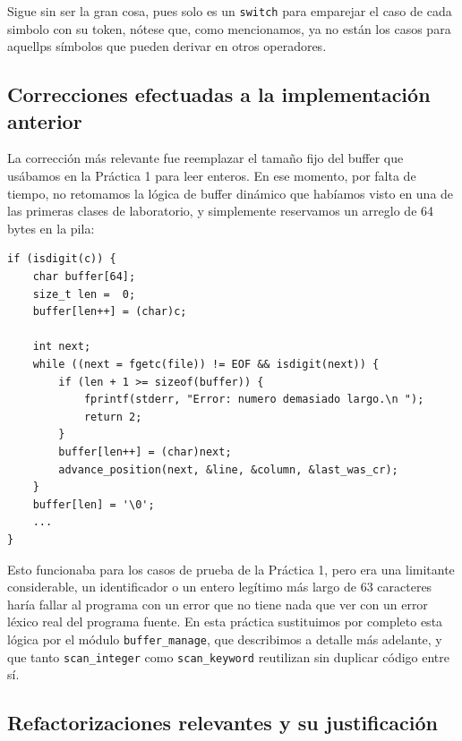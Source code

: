 \documentclass[12pt,letterpaper]{article}
\begin{document}
\bigskip

Sigue sin ser la gran cosa, pues solo es un \texttt{switch} para emparejar el caso de cada simbolo con su token,
nótese que, como mencionamos, ya no están los casos para aquellps símbolos que pueden derivar en otros
operadores.

\subsection*{Correcciones efectuadas a la implementación anterior}

La corrección más relevante fue reemplazar el tamaño fijo del buffer que usábamos en la Práctica 1 para leer
enteros. En ese momento, por falta de tiempo, no retomamos la lógica de buffer dinámico que habíamos visto en
una de las primeras clases de laboratorio, y simplemente reservamos un arreglo de 64 bytes en la pila:

\begin{lstlisting}[style=modernc, caption={Buffer de tamaño fijo usado en la Práctica 1 (\texttt{lexer-p1.c}).}]
if (isdigit(c)) {
    char buffer[64];
    size_t len =  0;
    buffer[len++] = (char)c;

    int next;
    while ((next = fgetc(file)) != EOF && isdigit(next)) {
        if (len + 1 >= sizeof(buffer)) {
            fprintf(stderr, "Error: numero demasiado largo.\n ");
            return 2;
        }
        buffer[len++] = (char)next;
        advance_position(next, &line, &column, &last_was_cr);
    }
    buffer[len] = '\0';
    ...
}
\end{lstlisting}

\bigskip

Esto funcionaba para los casos de prueba de la Práctica 1, pero era una limitante considerable, un
identificador o un entero legítimo más largo de 63 caracteres haría fallar al programa con un error que no
tiene nada que ver con un error léxico real del programa fuente. En esta práctica sustituimos por completo
esta lógica por el módulo \texttt{buffer\_manage}, que describimos a detalle más adelante, y que tanto
\texttt{scan\_integer} como \texttt{scan\_keyword} reutilizan sin duplicar código entre sí.

\subsection*{Refactorizaciones relevantes y su justificación}
\end{document}
